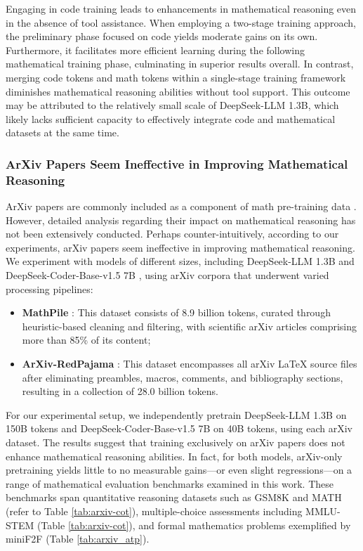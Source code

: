 \begin{itemize}[topsep=0pt]
\begin{itemize}[topsep=0pt]
Engaging in code training leads to enhancements in mathematical reasoning even in the absence of tool assistance. When employing a two-stage training approach, the preliminary phase focused on code yields moderate gains on its own. Furthermore, it facilitates more efficient learning during the following mathematical training phase, culminating in superior results overall. In contrast, merging code tokens and math tokens within a single-stage training framework diminishes mathematical reasoning abilities without tool support. This outcome may be attributed to the relatively small scale of DeepSeek-LLM 1.3B, which likely lacks sufficient capacity to effectively integrate code and mathematical datasets at the same time.

\subsubsection{ArXiv Papers Seem Ineffective in Improving Mathematical Reasoning}

ArXiv papers are commonly included as a component of math pre-training data \citep{minerva,gpt-f,llemma,mathpile}. However, detailed analysis regarding their impact on mathematical reasoning has not been extensively conducted. Perhaps counter-intuitively, according to our experiments, arXiv papers seem ineffective in improving mathematical reasoning. We experiment with models of different sizes, including DeepSeek-LLM 1.3B and DeepSeek-Coder-Base-v1.5 7B \citep{deepseek-coder}, using arXiv corpora that underwent varied processing pipelines:

\begin{itemize}[topsep=0pt]
    \item \textbf{MathPile} \citep{mathpile}: This dataset consists of 8.9 billion tokens, curated through heuristic-based cleaning and filtering, with scientific arXiv articles comprising more than 85\% of its content;
    \item \textbf{ArXiv-RedPajama} \citep{redpajama}: This dataset encompasses all arXiv LaTeX source files after eliminating preambles, macros, comments, and bibliography sections, resulting in a collection of 28.0 billion tokens.
\end{itemize}

For our experimental setup, we independently pretrain DeepSeek-LLM 1.3B on 150B tokens and DeepSeek-Coder-Base-v1.5 7B on 40B tokens, using each arXiv dataset. The results suggest that training exclusively on arXiv papers does not enhance mathematical reasoning abilities. In fact, for both models, arXiv-only pretraining yields little to no measurable gains—or even slight regressions—on a range of mathematical evaluation benchmarks examined in this work. These benchmarks span quantitative reasoning datasets such as GSM8K and MATH (refer to Table \ref{tab:arxiv-cot}), multiple-choice assessments including MMLU-STEM (Table \ref{tab:arxiv-cot}), and formal mathematics problems exemplified by miniF2F (Table \ref{tab:arxiv_atp}).


\end{itemize}
\end{itemize}
